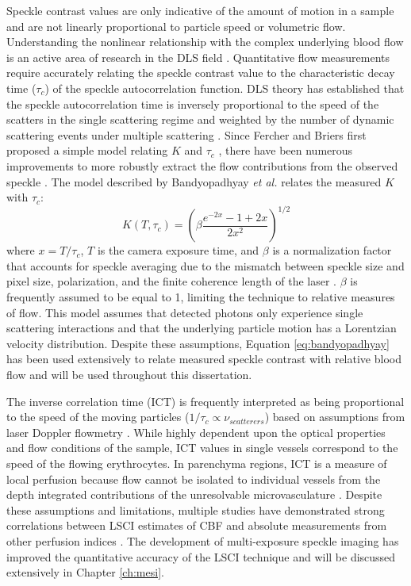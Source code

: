Speckle contrast values are only indicative of the amount of motion in a sample and are not linearly proportional to particle speed or volumetric flow. Understanding the nonlinear relationship with the complex underlying blood flow is an active area of research in the DLS field \cite{Duncan:2008fd, Briers:2013es}. Quantitative flow measurements require accurately relating the speckle contrast value to the characteristic decay time ($\tau_c$) of the speckle autocorrelation function. DLS theory has established that the speckle autocorrelation time is inversely proportional to the speed of the scatters in the single scattering regime \cite{Bonner:1981hga} and weighted by the number of dynamic scattering events under multiple scattering \cite{Boas:1997kf, Kazmi:2015du, Davis:2016ik}. Since Fercher and Briers first proposed a simple model relating $K$ and $\tau_c$ \cite{Fercher:1981jh}, there have been numerous improvements to more robustly extract the flow contributions from the observed speckle \cite{Bandyopadhyay:2005bg, Parthasarathy:2008el}. The model described by Bandyopadhyay \textit{et al.} \cite{Bandyopadhyay:2005bg} relates the measured $K$ with $\tau_c$:
%
\begin{equation}
    \label{eq:bandyopadhyay}
    K(T,\tau_c) = \left(\beta \frac{e^{-2x} - 1 + 2x}{2x^{2}}\right)^{1/2}
\end{equation}
%
where $x = T/\tau_c$, $T$ is the camera exposure time, and $\beta$ is a normalization factor that accounts for speckle averaging due to the mismatch between speckle size and pixel size, polarization, and the finite coherence length of the laser \cite{Lemieux:1999ko}. $\beta$ is frequently assumed to be equal to 1, limiting the technique to relative measures of flow. This model assumes that detected photons only experience single scattering interactions and that the underlying particle motion has a Lorentzian velocity distribution. Despite these assumptions, Equation \ref{eq:bandyopadhyay} has been used extensively to relate measured speckle contrast with relative blood flow \cite{Dunn:2011gi,Boas:2010vr} and will be used throughout this dissertation.

The inverse correlation time (ICT) is frequently interpreted as being proportional to the speed of the moving particles ($1/\tau_c \propto \nu_{scatterers}$) based on assumptions from laser Doppler flowmetry \cite{Bonner:1981hga}. While highly dependent upon the optical properties and flow conditions of the sample, ICT values in single vessels correspond to the speed of the flowing erythrocytes. In parenchyma regions, ICT is a measure of local perfusion because flow cannot be isolated to individual vessels from the depth integrated contributions of the unresolvable microvasculature \cite{Durduran:2016el, Dunn:2011gi}. Despite these assumptions and limitations, multiple studies have demonstrated strong correlations between LSCI estimates of CBF and absolute measurements from other perfusion indices \cite{Ayata:2004ba, Strong:2005kj, Kazmi:2015du}. The development of multi-exposure speckle imaging \cite{Parthasarathy:2008el} has improved the quantitative accuracy of the LSCI technique and will be discussed extensively in Chapter \ref{ch:mesi}.



